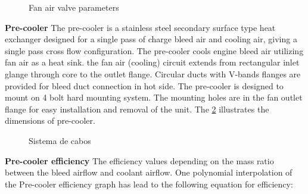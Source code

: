 \begin{figure}[H] %
\caption{Fan air valve parameters}
\label{fig:Valve}
\end{figure}

\textbf{Pre-cooler
}
The pre-cooler is a stainless steel secondary surface type heat exchanger designed for a single pass of charge bleed air and cooling air, giving a single pass cross flow configuration.
The pre-cooler cools engine bleed air utilizing fan air as a heat sink. the fan air (cooling) circuit extends from rectangular inlet glange through core to the outlet flange. Circular ducts with V-bands flanges are provided for bleed duct connection in hot side. The pre-cooler is designed to mount on 4 bolt hard mounting system. The mounting holes are in the fan outlet flange for easy installation and removal of the unit.
The \ref{fig:Precooler} illustrates the dimensions of pre-cooler.

\begin{figure}[H] %
\caption{Sistema de cabos}
\label{fig:Precooler}
\end{figure}

\textbf{Pre-cooler efficiency
}
The efficiency values depending on the mass ratio between the bleed airflow and coolant airflow.
One polynomial interpolation of the Pre-cooler efficiency graph has lead to the following equation for efficiency:

